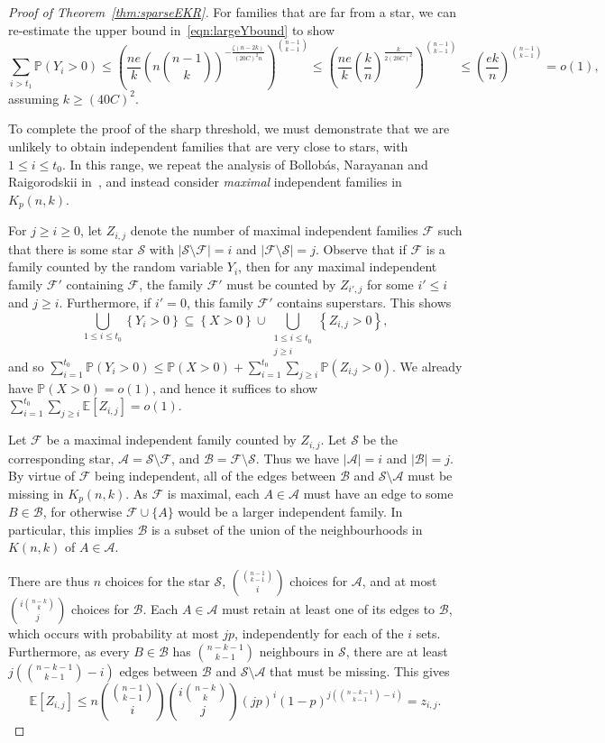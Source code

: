 \documentclass[11pt]{article}
\theoremstyle{definition}
\newcommand{\cA}{\mathcal{A}}
\newcommand{\cB}{\mathcal{B}}
\newcommand{\cS}{\mathcal{S}}
\newcommand{\cF}{\mathcal{F}}
\newcommand{\3}{\bf{3}}
\newcommand{\card}[1]{\left| #1 \right|}
\newcommand{\Prb}{\mathbb{P}}
\newcommand{\Exp}{\mathbb{E}}
\begin{document}
\begin{proof}[Proof of Theorem~\ref{thm:sparseEKR}]
For families that are far from a star, we can re-estimate the upper bound in~\eqref{eqn:largeYbound} to show
\[ \sum_{i > t_1} \Prb(Y_i > 0) \le \left( \frac{ne}{k} \left(n \binom{n-1}{k} \right)^{ - \frac{\zeta (n-2k)}{(20C)^2 n} } \right)^{\binom{n-1}{k-1}} \le \left( \frac{ne}{k} \left( \frac{k}{n} \right)^{ \frac{k}{2(20C)^2}} \right)^{\binom{n-1}{k-1}} \le \left( \frac{ek}{n} \right)^{\binom{n-1}{k-1}} = o(1), \]
assuming $k \ge (40C)^2$.

To complete the proof of the sharp threshold, we must demonstrate that we are unlikely to obtain independent families that are very close to stars, with $1 \le i \le t_0$.  In this range, we repeat the analysis of Bollob\'as, Narayanan and Raigorodskii in~\cite{bnr14}, and instead consider \emph{maximal} independent families in $K_p(n,k)$.

For $j \ge i \ge 0$, let $Z_{i,j}$ denote the number of maximal independent families $\cF$ such that there is some star $\cS$ with $\card{\cS \setminus \cF} = i$ and $\card{\cF \setminus \cS} = j$.  Observe that if $\cF$ is a family counted by the random variable $Y_i$, then for any maximal independent family $\cF'$ containing $\cF$, the family $\cF'$ must be counted by $Z_{i',j}$ for some $i' \le i$ and $j \ge i$.  Furthermore, if $i' = 0$, this family $\cF'$ contains superstars.  This shows
\[ \bigcup_{1 \le i \le t_0} \left\{ Y_i > 0 \right\} \subseteq \left\{ X > 0 \right\} \cup \bigcup_{\substack{1 \le i \le t_0 \\ j \ge i}} \left\{ Z_{i,j} > 0 \right\}, \]
and so $\sum_{i=1}^{t_0} \Prb(Y_i > 0) \le \Prb(X > 0) + \sum_{i=1}^{t_0} \sum_{j \ge i} \Prb(Z_{i.j} > 0)$.  We already have $\Prb( X > 0 ) = o(1)$, and hence it suffices to show $\sum_{i = 1}^{t_0} \sum_{j \ge i} \Exp [Z_{i,j} ] = o(1)$.

Let $\cF$ be a maximal independent family counted by $Z_{i,j}$.  Let $\cS$ be the corresponding star, $\cA = \cS \setminus \cF$, and $\cB = \cF \setminus \cS$.  Thus we have $\card{\cA} = i$ and $\card{\cB} = j$.  By virtue of $\cF$ being independent, all of the edges between $\cB$ and $\cS \setminus \cA$ must be missing in $K_p(n,k)$.  As $\cF$ is maximal, each $A \in \cA$ must have an edge to some $B \in \cB$, for otherwise $\cF \cup \{ A \}$ would be a larger independent family.  In particular, this implies $\cB$ is a subset of the union of the neighbourhoods in $K(n,k)$ of $A \in \cA$.

There are thus $n$ choices for the star $\cS$, $\binom{\binom{n-1}{k-1}}{i}$ choices for $\cA$, and at most $\binom{i \binom{n-k}{k}}{j}$ choices for $\cB$.  Each $A \in \cA$ must retain at least one of its edges to $\cB$, which occurs with probability at most $jp$, independently for each of the $i$ sets.  Furthermore, as every $B \in \cB$ has $\binom{n-k-1}{k-1}$ neighbours in $\cS$, there are at least $j \left( \binom{n-k-1}{k-1} - i\right)$ edges between $\cB$ and $\cS \setminus \cA$ that must be missing.  This gives
\[ \Exp [ Z_{i,j} ] \le n \binom{ \binom{n-1}{k-1}}{i} \binom{i \binom{n-k}{k}}{j} (jp)^i \left(1 - p \right)^{j \left(\binom{n-k-1}{k-1} - i\right)} = z_{i,j}. \]


\end{proof}
\end{document}
